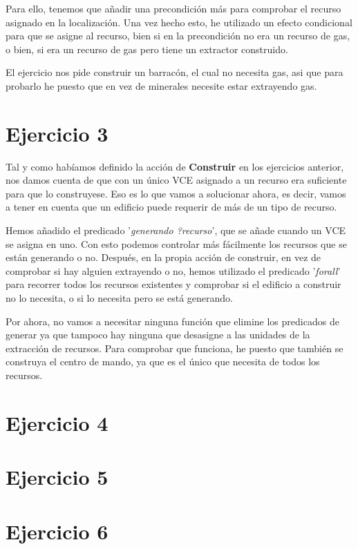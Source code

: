 \documentclass[11pt,a4paper]{article}
\begin{document}
Para ello, tenemos que añadir una precondición más para comprobar el recurso asignado en la localización. Una vez hecho esto, he
utilizado un efecto condicional para que se asigne al recurso, bien si en la precondición no era un recurso de gas, o bien, si
era un recurso de gas pero tiene un extractor construido.

El ejercicio nos pide construir un barracón, el cual no necesita gas, asi que para probarlo he puesto que en vez de minerales
necesite estar extrayendo gas.


\section*{Ejercicio 3}
Tal y como habíamos definido la acción de \textbf{Construir} en los ejercicios anterior, nos damos cuenta de que con un único VCE
asignado a un recurso era suficiente para que lo construyese. Eso es lo que vamos a solucionar ahora, es decir, vamos a tener en
cuenta que un edificio puede requerir de más de un tipo de recurso.

Hemos añadido el predicado '\textit{generando ?recurso}', que se añade cuando un VCE se asigna en uno. Con esto podemos controlar
más fácilmente los recursos que se están generando o no. Después, en la propia acción de construir, en vez de comprobar si hay
alguien extrayendo o no, hemos utilizado el predicado '\textit{forall}' para recorrer todos los recursos existentes y comprobar
si el edificio a construir no lo necesita, o si lo necesita pero se está generando.

Por ahora, no vamos a necesitar ninguna función que elimine los predicados de generar ya que tampoco hay ninguna que desasigne a
las unidades de la extracción de recursos. Para comprobar que funciona, he puesto que también se construya el centro de mando, ya
que es el único que necesita de todos los recursos.



\section*{Ejercicio 4}


\section*{Ejercicio 5}


\section*{Ejercicio 6}
\end{document}
